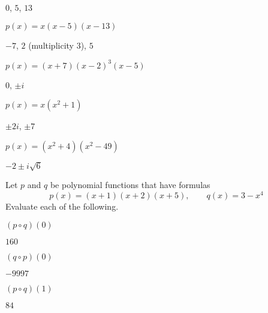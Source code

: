 \begin{exercises}
\begin{problem}
\begin{multicols}{3}
\begin{subproblem}
 			$0$, $5$, $13$
 			\begin{shortsolution}
 				$p(x)=x(x-5)(x-13)$
 			\end{shortsolution}
 		\end{subproblem}
 		\begin{subproblem}
 			$-7$, $2$ (multiplicity $3$), $5$
 			\begin{shortsolution}
 				$p(x)=(x+7)(x-2)^3(x-5)$
 			\end{shortsolution}
 		\end{subproblem}
 		\begin{subproblem}
 			$0$, $\pm i$
 			\begin{shortsolution}
 				$p(x)=x(x^2+1)$
 			\end{shortsolution}
 		\end{subproblem}
 		\begin{subproblem}
 			$\pm 2i$, $\pm 7$
 			\begin{shortsolution}
 				$p(x)=(x^2+4)(x^2-49)$
 			\end{shortsolution}
 		\end{subproblem}
 		\begin{subproblem}
 			$-2\pm i\sqrt{6}$
 		\end{subproblem}
 	\end{multicols}
 	\end{problem}
 	\begin{problem}
 	Let $p$ and $q$ be polynomial functions that have formulas
 	\[
 		p(x)=(x+1)(x+2)(x+5), \qquad q(x)=3-x^4
 	\]
 	Evaluate each of the following.
 	\begin{multicols}{4}
 		\begin{subproblem}
 			$(p\circ q)(0)$
 			\begin{shortsolution}
 				$160$
 			\end{shortsolution}
 		\end{subproblem}
 		\begin{subproblem}
 			$(q\circ p)(0)$
 			\begin{shortsolution}
 				$-9997$
 			\end{shortsolution}
 		\end{subproblem}
 		\begin{subproblem}
 			$(p\circ q)(1)$
 			\begin{shortsolution}
 				$84$
 			\end{shortsolution}

\end{subproblem}
\end{multicols}
\end{problem}
\end{exercises}
